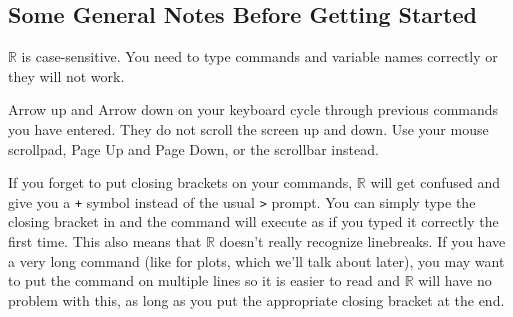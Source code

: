 \documentclass[12pt]{article}
\begin{document}
\subsection{Some General Notes Before Getting Started}
\begin{itemize*}
\item $\mathbb{R}$ is case-sensitive. You need to type commands and variable names correctly or they will not work.
\item Arrow up and Arrow down on your keyboard cycle through previous commands you have entered. They do not scroll the screen up and down. Use your mouse scrollpad, Page Up and Page Down, or the scrollbar instead.
\item If you forget to put closing brackets on your commands, $\mathbb{R}$ will get confused and give you a \verb|+| symbol instead of the usual \verb|>| prompt. You can simply type the closing bracket in and the command will execute as if you typed it correctly the first time. This also means that $\mathbb{R}$ doesn't really recognize linebreaks. If you have a very long command (like for plots, which we'll talk about later), you may want to put the command on multiple lines so it is easier to read and $\mathbb{R}$ will have no problem with this, as long as you put the appropriate closing bracket at the end.
\end{itemize*}
\end{document}
